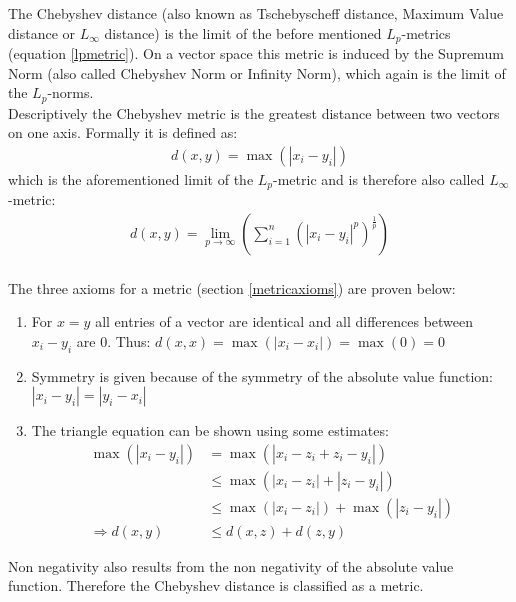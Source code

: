 The Chebyshev distance (also known as Tschebyscheff distance, Maximum Value distance or $L_\infty$ distance) is the limit of the before mentioned $L_p$-metrics (equation \ref{lpmetric}). On a vector space this metric is induced by the Supremum Norm (also called Chebyshev Norm or Infinity Norm), which again is the limit of the $L_p$-norms.\\
Descriptively the Chebyshev metric is the greatest distance between two vectors on one axis. Formally it is defined as:
%
\begin{align}
    d(x, y) = \max (| x_i - y_i |)
\end{align}
%
which is the aforementioned limit of the $L_p$-metric and is therefore also called $L_\infty$-metric:
\begin{align}
    d(x, y) = \lim \limits_{p \to \infty} \left( \sum_{i=1}^{n}(|x_i-y_i|^p)^\frac{1}{p} \right)
\end{align}
\ \\
The three axioms for a metric (section \ref{metricaxioms}) are proven below:
\begin{enumerate}
    \item For $x = y$ all entries of a vector are identical and all differences between $x_i - y_i$ are $0$. Thus: $d(x,x) = \max (|x_i - x_i|) = \max (0) = 0$
    \item Symmetry is given because of the symmetry of the absolute value function: 
          $| x_i - y_i | = | y_i - x_i |$
    \item The triangle equation can be shown using some estimates:
    \begin{align*}
        \max(| x_i - y_i |) &= \max(|x_i - z_i + z_i - y_i|)\\
         &\leq \max(|x_i - z_i|+ |z_i - y_i|) \\
         &\leq \max(| x_i - z_i |) + \max(|z_i - y_i|)\\
        \Rightarrow d(x,y) &\leq d(x, z) + d(z, y)
    \end{align*}
\end{enumerate}
Non negativity also results from the non negativity of the absolute value function. Therefore the Chebyshev distance is classified as a metric.
